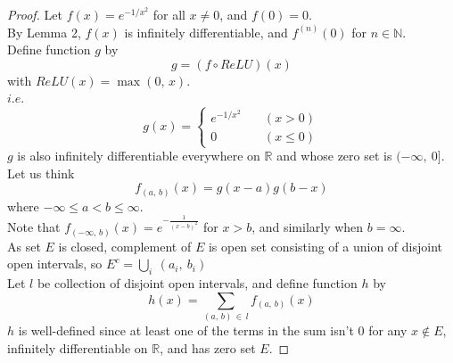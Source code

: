 \documentclass[12pt]{book}
\theoremstyle{definition}
\newcommand{\N}{\mathbb{N}}
\newcommand{\R}{\mathbb{R}}
\begin{document}
		\begin{proof}
			Let $f(x)=e^{-1/x^2}$ for all $x\neq0$, and $f(0)=0$.\\
			By Lemma 2, $f(x)$ is infinitely differentiable, and $f^{(n)}(0)$ for $n\in\N$.\\
			Define function $g$ by $$g=(f\circ ReLU)(x)$$ with
			$ReLU(x)=\max(0,\,x)$.\\
			$i.e.$
			\begin{equation*}
				g(x)=\begin{cases}
					e^{-1/x^2}&\quad(x>0)\\
					0&\quad(x\leq 0)
				\end{cases}
			\end{equation*}
			$g$ is also infinitely differentiable everywhere on $\R$ and whose zero set is $(-\infty,\ 0]$.\\
			Let us think
			\begin{equation*}
				f_{(a,\,b)}(x)=g(x-a)g(b-x)
			\end{equation*}
			where $-\infty\leq a < b\leq \infty$.\\
			Note that $f_{(-\infty,\,b)}(x)=e^{-\frac{1}{(x-b)^2}}$ for $x>b$, and similarly when $b=\infty$.\\
			As set $E$ is closed, complement of $E$ is open set consisting of a union of disjoint open intervals, so $E^c=\displaystyle\bigcup_i\ (a_i,\ b_i)$\\
			Let $l$ be collection of disjoint open intervals, and define function $h$ by
			$$h(x)=\sum_{(a,\,b)\,\in\, l} f_{(a,\,b)}(x)$$
			$h$ is well-defined since at least one of the terms in the sum isn't $0$ for any $x \notin E$, infinitely differentiable on $\R$, and has zero set $E$.
		\end{proof}
		\newpage
\end{document}
